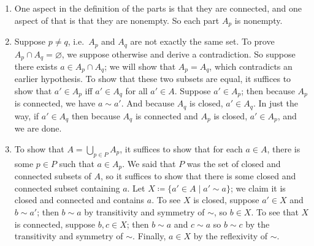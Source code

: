 \documentclass[7Sketches]{subfiles}
\begin{document}
{
\begin{enumerate}
	\item One aspect in the definition of the parts is that they are connected, and one aspect of that is that they are nonempty. So each part $A_p$ is nonempty.
	\item Suppose $p\neq q$, i.e.\ $A_p$ and $A_q$ are not exactly the same set. To prove $A_p\cap A_q=\varnothing$, we suppose otherwise and derive a contradiction. So suppose there exists $a\in A_p\cap A_q$; we will show that $A_p=A_q$, which contradicts an earlier hypothesis. To show that these two subsets are equal, it suffices to show that $a'\in A_p$ iff $a'\in A_q$ for all $a'\in A$. Suppose $a'\in A_p$; then because $A_p$ is connected, we have $a\sim a'$. And because $A_q$ is closed, $a'\in A_q$. In just the way, if $a'\in A_q$ then because $A_q$ is connected and $A_p$ is closed, $a'\in A_p$, and we are done.
	\item To show that $A=\bigcup_{p\in P}A_p$, it suffices to show that for each $a\in A$, there is some $p\in P$ such that $a\in A_p$. We said that $P$ was the set of closed and connected subsets of $A$, so it suffices to show that there is some closed and connected subset containing $a$. Let $X\coloneqq\{a'\in A\mid a'\sim a\}$; we claim it is closed and connected and contains $a$. To see $X$ is closed, suppose $a'\in X$ and $b\sim a'$; then $b\sim a$ by transitivity and symmetry of $\sim$, so $b\in X$. To see that $X$ is connected, suppose $b,c\in X$; then $b\sim a$ and $c\sim a$ so $b\sim c$ by the transitivity and symmetry of $\sim$. Finally, $a\in X$ by the reflexivity of $\sim$.
\end{enumerate}
}
\end{document}
